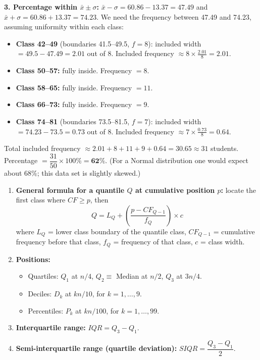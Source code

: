 \documentclass[11pt]{article}
\begin{document}
\begin{exoresolu}
\textbf{3. Percentage within $\bar{x} \pm \sigma$:}
$\bar{x} - \sigma = 60.86 - 13.37 = 47.49$ and $\bar{x} + \sigma = 60.86 + 13.37 = 74.23$.
We need the frequency between 47.49 and 74.23, assuming uniformity within each class:
\begin{itemize}
    \item \textbf{Class 42--49} (boundaries 41.5--49.5, $f=8$): included width $= 49.5 - 47.49 = 2.01$ out of 8. Included frequency $\approx 8 \times \frac{2.01}{8} = 2.01$.
    \item \textbf{Class 50--57:} fully inside. Frequency $= 8$.
    \item \textbf{Class 58--65:} fully inside. Frequency $= 11$.
    \item \textbf{Class 66--73:} fully inside. Frequency $= 9$.
    \item \textbf{Class 74--81} (boundaries 73.5--81.5, $f=7$): included width $= 74.23 - 73.5 = 0.73$ out of 8. Included frequency $\approx 7 \times \frac{0.73}{8} = 0.64$.
\end{itemize}
Total included frequency $\approx 2.01 + 8 + 11 + 9 + 0.64 = 30.65 \approx 31$ students.
Percentage $= \dfrac{31}{50} \times 100\% = \mathbf{62\%}$.
(For a Normal distribution one would expect about $68\%$; this data set is slightly skewed.)
\end{exoresolu}

\begin{methode}
\begin{enumerate}
    \item \textbf{General formula for a quantile $Q$ at cumulative position $p$:} locate the first class where $CF \ge p$, then
    \[ Q = L_Q + \left( \frac{p - CF_{Q-1}}{f_Q} \right) \times c \]
    where $L_Q$ = lower class boundary of the quantile class, $CF_{Q-1}$ = cumulative frequency before that class, $f_Q$ = frequency of that class, $c$ = class width.
    \item \textbf{Positions:}
    \begin{itemize}
        \item Quartiles: $Q_1$ at $n/4$, $Q_2 \equiv$ Median at $n/2$, $Q_3$ at $3n/4$.
        \item Deciles: $D_k$ at $kn/10$, for $k = 1, \dots, 9$.
        \item Percentiles: $P_k$ at $kn/100$, for $k = 1, \dots, 99$.
    \end{itemize}
    \item \textbf{Interquartile range:} $IQR = Q_3 - Q_1$.
    \item \textbf{Semi-interquartile range (quartile deviation):} $SIQR = \dfrac{Q_3 - Q_1}{2}$.
\end{enumerate}
\end{methode}
\end{document}
